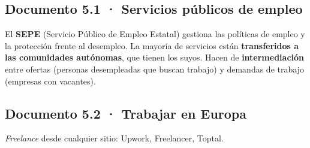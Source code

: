 \subsection*{Documento 5.1 · Servicios públicos de empleo}
El \textbf{SEPE} (Servicio Público de Empleo Estatal) gestiona las políticas de empleo y la protección frente al desempleo. La mayoría de servicios están \textbf{transferidos a las comunidades autónomas}, que tienen los suyos. Hacen de \textbf{intermediación} entre ofertas (personas desempleadas que buscan trabajo) y demandas de trabajo (empresas con vacantes).

\subsection*{Documento 5.2 · Trabajar en Europa}
\begin{center}
\end{center}
\emph{Freelance} desde cualquier sitio: Upwork, Freelancer, Toptal.

